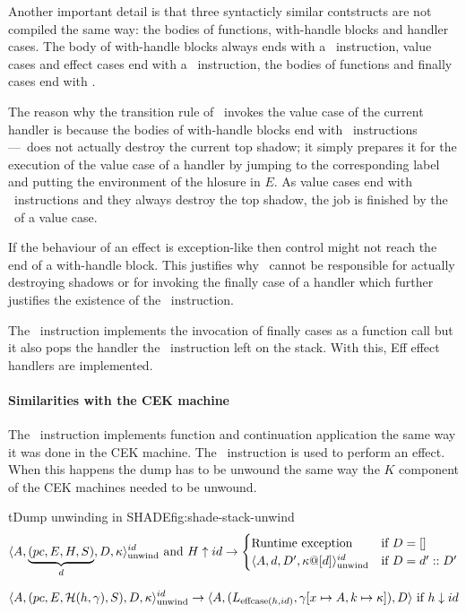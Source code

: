 \documentclass[class=article, crop=false]{standalone}
\begin{document}
Another important detail is that three syntacticly similar contstructs are not
compiled the same way: the bodies of functions, with-handle blocks and handler
cases.
The body of with-handle blocks
always ends with a \vmKillShadow\  instruction, value cases and effect cases end
with a \vmRett\ instruction, the bodies of functions and finally cases end with
\vmRet.

The reason why the transition rule of \vmKillShadow\ invokes the value case of
the current handler is because the bodies of with-handle blocks end with
\vmKillShadow\ instructions---\vmKillShadow\ does not actually destroy the
current top shadow; it simply prepares it for the execution of the value case
of a handler by jumping to the corresponding label and putting the environment
of the hlosure in $E$. As value cases end with \vmRett\ instructions and they
always destroy the top shadow, the job is finished by the \vmRett\ of a value
case.

If the behaviour of an effect is exception-like then control might not reach
the end of a with-handle block. This justifies why \vmKillShadow\ cannot be
responsible for actually destroying shadows or for invoking the finally case of
a handler which further justifies the existence of the \vmFin\ instruction.

The \vmFin\ instruction implements the invocation of finally cases as a
function call but it also pops the handler the \vmCastShadow\ instruction left
on the stack. With this, Eff effect handlers are implemented.

\paragraph{Similarities with the CEK machine}
The \vmApply\ instruction implements function and continuation application the
same way it was done in the CEK machine. The \vmThrow\ instruction is used to
perform an effect. When this happens the dump has to be unwound the same way
the $K$ component of the CEK machines needed to be unwound.

\begin{myfigure}[1]{t}{Dump unwinding in SHADE}{fig:shade-stack-unwind}
    $$ \langle A, \underbrace{(pc, E, H, S)}_d, D, \kappa  \rangle_\text{unwind}^{id} \text{ and } H \uparrow id \to \begin{cases}
        \text{Runtime exception} & \text{if } D = [] \\
    \langle A, d, D', \kappa @ [d] \rangle_\text{unwind}^{id} & \text{if } D = d' :: D' \end{cases} $$

    $$ \langle A, (pc, E, \mathcal{H}(h, \gamma), S), D, \kappa \rangle_\text{unwind}^{id} \to
        \langle A, (L_{\text{effcase}(h, id)}, \gamma[x \mapsto A, k \mapsto \kappa] ), D \rangle \text{ if } h \downarrow id $$
\end{myfigure}
\end{document}
